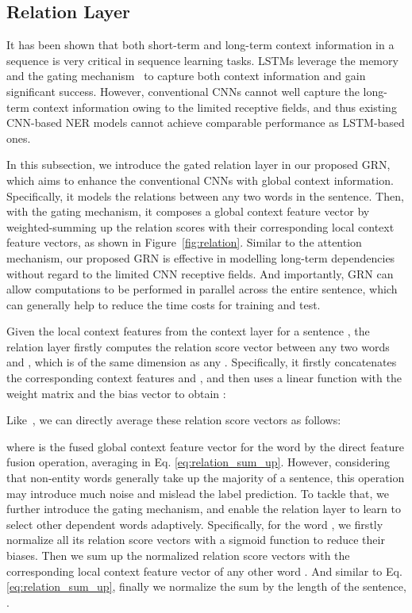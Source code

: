 \documentclass[letterpaper]{article} \usepackage{aaai19}  \usepackage{times}  \usepackage{helvet}  \usepackage{courier}  \usepackage{url}  \usepackage{graphicx}  \usepackage{amsmath}
\newcommand{\ie}{\text{i.e.,}}
\newcommand{\GRN}{GRN}
\begin{document}
\subsection{Relation Layer}
It has been shown that both short-term and long-term context information in a sequence is very critical in sequence learning tasks. LSTMs leverage the memory and the gating mechanism~\cite{hochreiter1997long} to capture both context information and gain significant success. However, conventional CNNs cannot well capture the long-term context information owing to the limited receptive fields, and thus existing CNN-based NER models cannot achieve comparable performance as LSTM-based ones.

In this subsection, we introduce the gated relation layer in our proposed \GRN{}, which aims to enhance the conventional CNNs with global context information. Specifically, it models the relations between any two words in the sentence. Then, with the gating mechanism, it composes a global context feature vector by weighted-summing up the relation scores with their corresponding local context feature vectors, as shown in Figure~\ref{fig:relation}. Similar to the attention mechanism, our proposed \GRN{} is effective in modelling long-term dependencies without regard to the limited CNN receptive fields. And importantly, \GRN{} can allow computations to be performed in parallel across the entire sentence, which can generally help to reduce the time costs for training and test.





Given the local context features  from the context layer for a sentence , the relation layer firstly computes the relation score vector  between any two words  and , which is of the same dimension as any . Specifically, it firstly concatenates the corresponding context features  and , and then uses a linear function with the weight matrix  and the bias vector  to obtain :


Like~\cite{santoro2017simple}, we can directly average these relation score vectors as follows:

where  is the fused global context feature vector for the word  by the direct feature fusion operation, \ie{} averaging in Eq. \ref{eq:relation_sum_up}. However, considering that non-entity words generally take up the majority of a sentence,  this operation may introduce much noise and mislead the label prediction. To tackle that, we further introduce the gating mechanism, and enable the relation layer to learn to select other dependent words adaptively. Specifically, for the word , we firstly normalize all its relation score vectors  with a sigmoid function to reduce their biases. Then we sum up the normalized relation score vectors  with the corresponding local context feature vector  of any other word . And similar to Eq. \ref{eq:relation_sum_up}, finally we normalize the sum by the length of the sentence, \ie{} .
\end{document}
